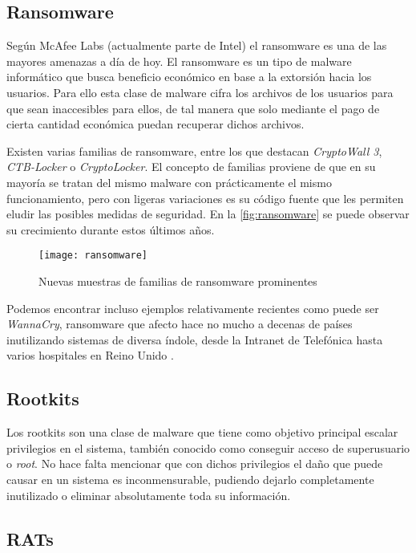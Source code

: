 \subsection{Ransomware}

Según McAfee Labs \cite{mcafee-predictions} (actualmente parte de Intel) el ransomware es una de las mayores amenazas a día de hoy. El ransomware es un tipo de malware informático que busca beneficio económico en base a la extorsión hacia los usuarios. Para ello esta clase de malware cifra los archivos de los usuarios para que sean inaccesibles para ellos, de tal manera que solo mediante el pago de cierta cantidad económica puedan recuperar dichos archivos.

Existen varias familias de ransomware, entre los que destacan \emph{CryptoWall 3}, \emph{CTB-Locker} o \emph{CryptoLocker}. El concepto de familias proviene de que en su mayoría se tratan del mismo malware con prácticamente el mismo funcionamiento, pero con ligeras variaciones es su código fuente que les permiten eludir las posibles medidas de seguridad. En la \autoref{fig:ransomware} se puede observar su crecimiento durante estos últimos años.

\begin{figure}[H]
	\centering
	\texttt{[image: ransomware]}
	\caption{Nuevas muestras de familias de ransomware prominentes \cite{mcafee-predictions}}
	\label{fig:ransomware}
\end{figure}

Podemos encontrar incluso ejemplos relativamente recientes como puede ser \textit{WannaCry}, ransomware que afecto hace no mucho a decenas de países inutilizando sistemas de diversa índole, desde la Intranet de Telefónica hasta varios hospitales en Reino Unido \cite{wannacry1} \cite{wannacry2}.


\subsection{Rootkits}

Los rootkits son una clase de malware que tiene como objetivo principal escalar privilegios en el sistema, también conocido como conseguir acceso de superusuario o \textit{root}. No hace falta mencionar que con dichos privilegios el daño que puede causar en un sistema es inconmensurable, pudiendo dejarlo completamente inutilizado o eliminar absolutamente toda su información.

\subsection{RATs}

